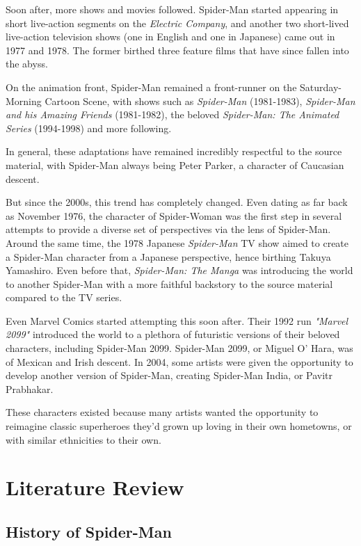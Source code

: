 \documentclass[%
 reprint,
 amsmath,amssymb,
 aps,
]{revtex4-2}
\begin{document}
Soon after, more shows and movies followed. Spider-Man started appearing in short live-action segments on the \textit{Electric Company}, and another two short-lived live-action television shows (one in English and one in Japanese) came out in 1977 and 1978. The former birthed three feature films that have since fallen into the abyss.

On the animation front, Spider-Man remained a front-runner on the Saturday-Morning Cartoon Scene, with shows such as \textit{Spider-Man} (1981-1983), \textit{Spider-Man and his Amazing Friends} (1981-1982), the beloved \textit{Spider-Man: The Animated Series} (1994-1998) and more following.

In general, these adaptations have remained incredibly respectful to the source material, with Spider-Man always being Peter Parker, a character of Caucasian descent.

But since the 2000s, this trend has completely changed. Even dating as far back as November 1976, the character of Spider-Woman was the first step in several attempts to provide a diverse set of perspectives via the lens of Spider-Man. Around the same time, the 1978 Japanese \textit{Spider-Man} TV show aimed to create a Spider-Man character from a Japanese perspective, hence birthing Takuya Yamashiro. Even before that, \textit{Spider-Man: The Manga} was introducing the world to another Spider-Man with a more faithful backstory to the source material compared to the TV series.

Even Marvel Comics started attempting this soon after. Their 1992 run \textit{"Marvel 2099"} introduced the world to a plethora of futuristic versions of their beloved characters, including Spider-Man 2099. Spider-Man 2099, or Miguel O' Hara, was of Mexican and Irish descent. In 2004, some artists were given the opportunity to develop another version of Spider-Man, creating Spider-Man India, or Pavitr Prabhakar.

These characters existed because many artists wanted the opportunity to reimagine classic superheroes they'd grown up loving in their own hometowns, or with similar ethnicities to their own.

\section{\label{sec:literature-review}Literature Review}

\subsection{\label{subsec:history}History of Spider-Man}
\end{document}
